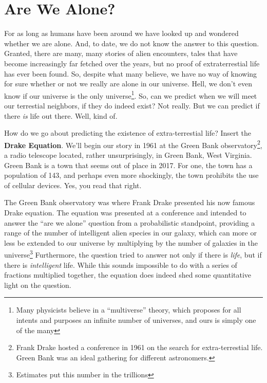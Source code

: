 \documentclass[../../fulltext/fulltext.tex]{subfiles}
\begin{document}
\chapter{Are We Alone?}

For as long as humans have been around we have looked up and wondered whether we are alone. 
And, to date, we do not know the answer to this question.  Granted, there are many, many stories of alien encounters, tales that have become increasingly far fetched over the years, but no proof of extraterrestial life has ever been found. So, despite what many believe, we have no way of knowing for sure whether or not we really are alone in our universe.  Hell, we don't even know if our universe is the only universe\footnote{Many physicists believe in a \enquote{multiverse} theory, which proposes for all intents and purposes an infinite number of universes, and ours is simply one of the many}. So, can we predict when we will meet our terrestial neighbors, if they do indeed exist?  Not really.  But we can predict if there \emph{is} life out there.  Well, kind of.  

How do we go about predicting the existence of extra-terrestial life?  Insert the \textbf{Drake Equation}. We'll begin our story in 1961 at the Green Bank observatory\footnote{ Frank Drake hosted a conference in 1961 on the search for extra-terrestial life.  Green Bank was an ideal gathering for different astronomers.}, a radio telescope located, rather unsurprisingly, in Green Bank, West Virginia.\cite{GreenBank} Green Bank is a town that seems out of place in 2017. For one, the town has a population of 143, and perhaps even more shockingly, the town prohibits the use of cellular devices.  Yes, you read that right.  

The Green Bank observatory was where Frank Drake presented his now famous Drake equation.  The equation was presented at a conference and intended to answer the ``are we alone'' question from a probabilistic standpoint, providing a range of the number of intelligent alien species in our galaxy, which can more or less be extended to our universe by multiplying by the number of galaxies in the universe\cite{numgalax}\footnote{Estimates put this number in the trillions} Furthermore, the question tried to answer not only if there is \emph{life}, but if there is \emph{intelligent} life.  While this sounds impossible to do with a series of fractions multiplied together, the equation does indeed shed some quantitative light on the question.
\end{document}
